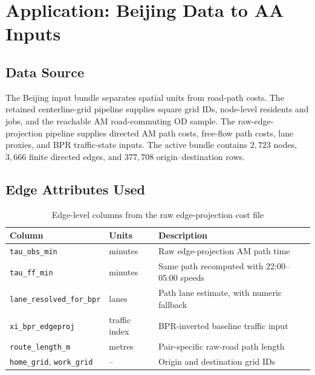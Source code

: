 \documentclass[12pt, a4paper]{article}
\begin{document}
\section{Application: Beijing Data to AA Inputs}
\label{sec:application}

\subsection{Data Source}

The Beijing input bundle separates spatial units from road-path costs.
The retained centerline-grid pipeline supplies square grid IDs, node-level
residents and jobs, and the reachable AM road-commuting OD sample.  The
raw-edge-projection pipeline supplies directed AM path costs, free-flow
path costs, lane proxies, and BPR traffic-state inputs.  The active bundle
contains $2{,}723$ nodes, $3{,}666$ finite directed edges, and $377{,}708$
origin--destination rows.

\subsection{Edge Attributes Used}

\begin{table}[H]
\centering
\caption{Edge-level columns from the raw edge-projection cost file}
\label{tab:edge_cols}
\small
\begin{tabular}{p{4.5cm}p{2.3cm}p{6.0cm}}
\toprule
Column & Units & Description \\
\midrule
\texttt{tau\_obs\_min}      & minutes & Raw edge-projection AM path time \\
\texttt{tau\_ff\_min}       & minutes & Same path recomputed with 22:00--05:00 speeds \\
\texttt{lane\_resolved\_for\_bpr} & lanes & Path lane estimate, with numeric fallback \\
\texttt{xi\_bpr\_edgeproj} & traffic index & BPR-inverted baseline traffic input \\
\texttt{route\_length\_m}& metres  & Pair-specific raw-road path length \\
\texttt{home\_grid}, \texttt{work\_grid} & -- & Origin and destination grid IDs \\
\bottomrule
\end{tabular}
\end{table}
\end{document}
